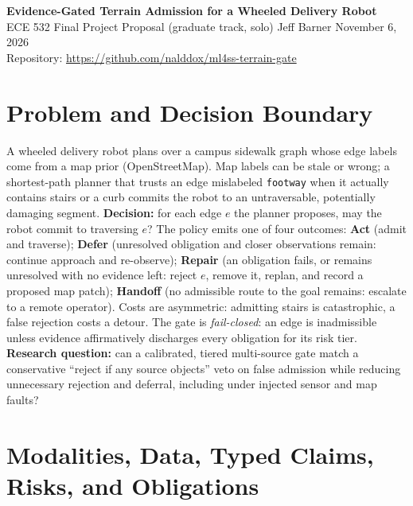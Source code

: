 \documentclass[10pt,letterpaper]{article}
\newcommand{\repourl}{\url{https://github.com/nalddox/ml4ss-terrain-gate}}
\newcommand{\cl}[1]{\texttt{#1}}
\begin{document}
\begin{center}
{\large\bfseries Evidence-Gated Terrain Admission for a Wheeled Delivery Robot}\\[2pt]
{\small ECE 532 Final Project Proposal (graduate track, solo) \quad Jeff Barner \quad November 6, 2026}\\
{\small Repository: \repourl}
\end{center}

\section{Problem and Decision Boundary}

A wheeled delivery robot plans over a campus sidewalk graph whose edge labels come from a
map prior (OpenStreetMap). Map labels can be stale or wrong; a shortest-path planner that trusts
an edge mislabeled \cl{footway} when it actually contains stairs or a curb commits the robot to an
untraversable, potentially damaging segment. \textbf{Decision:} for each edge $e$ the planner proposes, may the
robot commit to traversing $e$? The policy emits one of four outcomes:
\textbf{Act} (admit and traverse); \textbf{Defer} (unresolved obligation and closer observations
remain: continue approach and re-observe); \textbf{Repair} (an obligation fails, or remains
unresolved with no evidence left: reject $e$, remove it, replan, and record a proposed map patch);
\textbf{Handoff} (no admissible route to the goal remains: escalate to a remote operator).
Costs are asymmetric: admitting stairs is catastrophic, a false rejection costs a detour. The gate is
\emph{fail-closed}: an edge is inadmissible unless evidence affirmatively discharges every
obligation for its risk tier. \textbf{Research question:} can a calibrated, tiered multi-source
gate match a conservative ``reject if any source objects'' veto on false admission while reducing
unnecessary rejection and deferral, including under injected sensor and map faults?

\section{Modalities, Data, Typed Claims, Risks, and Obligations}
\end{document}
